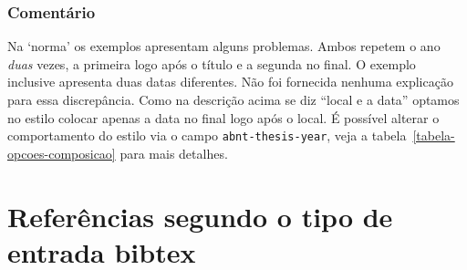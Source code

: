 \documentclass[a4paper]{ltxdoc}
\begin{document}
\subsubsection{Comentário}
Na `norma' os exemplos  apresentam alguns
problemas. Ambos repetem o ano \emph{duas} vezes, a primeira logo após o título
e a segunda no final. O exemplo  inclusive apresenta
duas datas diferentes.
Não foi fornecida nenhuma explicação para essa discrepância.
Como na descrição acima se diz ``local e a data'' optamos no estilo colocar
apenas a data no final logo após o local.
É possível alterar o comportamento do estilo via o campo {\tt abnt-thesis-year},
veja a tabela~\ref{tabela-opcoes-composicao} para mais detalhes.


\section{Referências segundo o tipo de entrada bibtex}
\end{document}
